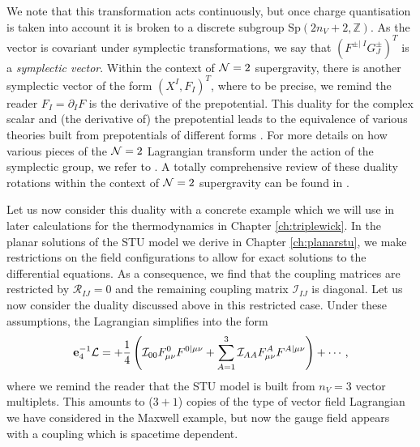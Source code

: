 We note that this transformation acts continuously, but once charge quantisation is taken into account it is broken to a discrete subgroup $\text{Sp}(2n_V + 2, \mathbb{Z})$. As the vector is covariant under symplectic transformations, we say that $(F^{\pm | \; I} G_J^{\pm})^T$ is a \emph{symplectic vector}. Within the context of ${\cal N} = 2$ supergravity, there is another symplectic vector of the form $(X^I, F_I)^T$, where to be precise, we remind the reader $F_I = \partial_I F$ is the derivative of the prepotential. This duality for the complex scalar and (the derivative of) the prepotential leads to the equivalence of various theories built from prepotentials of different forms \cite{deWit:2001pz}. For more details on how various pieces of the ${\cal N} = 2$ Lagrangian transform under the action of the symplectic group, we refer to \cite{Mohaupt:2008gt}. A totally comprehensive review of these duality rotations within the context of ${\cal N} = 2$ supergravity can be found in \cite{LopesCardoso:2019mlj}.

Let us now consider this duality with a concrete example which we will use in later calculations for the thermodynamics in Chapter \ref{ch:triplewick}. In the planar solutions of the STU model we derive in Chapter \ref{ch:planarstu}, we make restrictions on the field configurations to allow for exact solutions to the differential equations. As a consequence, we find that the coupling matrices are restricted by $\mathcal{R}_{IJ} = 0$ and the remaining coupling matrix $\mathcal{I}_{IJ}$ is diagonal. Let us now consider the duality discussed above in this restricted case. Under these assumptions, the Lagrangian  simplifies into the form
\begin{equation}
\label{eq:vecmullagsimple}
\mathbf{e}_4^{-1} {\cal L} =  
 + \frac{1}{4} \left(  {\cal I}_{00} F^0_{\mu \nu} F^{0|\mu \nu} 
+ \sum_{A=1}^3  {\cal I}_{AA} F^A_{\mu \nu} F^{A|\mu \nu} \right) + \cdots,
\end{equation}
where we remind the reader that the STU model is built from $n_V = 3$ vector multiplets. This amounts to ($3+1$) copies of the type of vector field Lagrangian we have considered in the Maxwell example, but now the gauge field appears with a coupling which is spacetime dependent.

